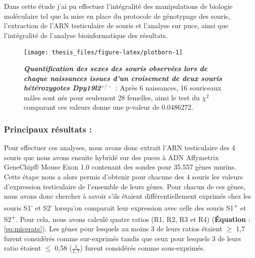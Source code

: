 \documentclass[12pt,twoside]{ugathesis}
\begin{document}
Dans cette étude j'ai pu effectuer l'intégralité des manipulations de
biologie moléculaire tel que la mise en place du protocole de génotypage
des souris, l'extraction de l'ARN testiculaire de souris et l'analyse
sur puce, ainsi que l'intégralité de l'analyse bioinformatique des
résultats.

\newpage

\begin{figure}

{\centering \texttt{[image: thesis\_files/figure-latex/plotborn-1]} 

}

\caption[Quantification des sexes des souris observées lors de chaque naissances issues d'un croisement de deux souris hétérozygotes *Dpy19l2*$^{+/-}$]{\textbf{\emph{Quantification des sexes des souris
observées lors de chaque naissances issues d'un croisement de deux
souris hétérozygotes \emph{Dpy19l2}\(^{+/-}\)}} : Après 6 naissances, 16
souriceaux mâles sont nés pour seulement 28 femelles, ainsi le test du
\(\chi^2\) comparant ces valeurs donne une p-valeur de 0.0486272.}\label{fig:plotborn}
\end{figure}







\newpage



\newpage

\subsubsection{Principaux résultats :}\label{principaux-resultats-1}

Pour effectuer ces analyses, nous avons donc extrait l'ARN testiculaire
des 4 souris que nous avons ensuite hybridé sur des puces à ADN
Affymetrix GeneChip® Mouse Exon 1.0 contenant des sondes pour 35.557
gènes murins. Cette étape nous a alors permis d'obtenir pour chacune des
4 souris les valeurs d'expression testiculaire de l'ensemble de leurs
gènes. Pour chacun de ces gènes, nous avons donc chercher à savoir s'ils
étaient différentiellement exprimés chez les souris
S1\textsuperscript{-} et S2\textsuperscript{-} lorsqu'on comparait leur
expression avec celle des souris S1\textsuperscript{+} et
S2\textsuperscript{+}. Pour cela, nous avons calculé quatre ratios (R1,
R2, R3 et R4) (\textbf{Équation} : \eqref{eq:micerate}). Les gènes pour
lesquels au moins 3 de leurs ratios étaient \(\ge\) 1,7 furent
considérés comme sur-exprimés tandis que ceux pour lesquels 3 de leurs
ratio étaient \(\le\) 0,58 (\(\frac{1}{1,7}\)) furent considérés comme
sous-exprimés.\\
\end{document}
